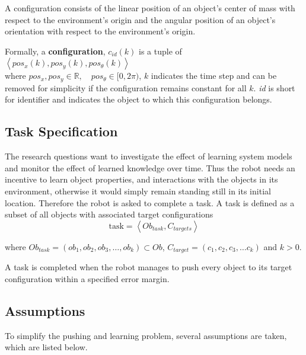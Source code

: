 A configuration consists of the linear position of an object's center of mass with respect to the environment's origin and the angular position of an object's orientation with respect to the environment's origin.\bs

Formally, a \textbf{configuration}, $c_{id}(k)$ is a tuple of $\left\langle pos_x(k), pos_y(k), pos_\theta(k)\right\rangle$\\ where $pos_x, pos_y \in \mathbb{R}, \quad  pos_\theta \in [0, 2\pi)$, \quad $k$ indicates the time step and can be removed for simplicity if the configuration remains constant for all $k$. \textit{id} is short for identifier and indicates the object to which this configuration belongs.\\

\subsection{Task Specification}%
\label{subsec:task}
The research questions want to investigate the effect of learning system models and monitor the effect of learned knowledge over time. Thus the robot needs an incentive to learn object properties, and interactions with the objects in its environment, otherwise it would simply remain standing still in its initial location. Therefore the robot is asked to complete a task. A task is defined as a subset of all objects with associated target configurations\bs
\[\text{task} = \left\langle Ob_{task}, C_{targets} \right\rangle\]

where $Ob_{task} = (ob_1, ob_2, ob_3, \dots, ob_k) \subset Ob$, $C_{target} = (c_1, c_2, c_3, \dots c_k)$ and $k>0$.\bs

A task is completed when the robot manages to push every object to its target configuration within a specified error margin.

\subsection{Assumptions}%
\label{subsec:assumptions}
To simplify the pushing and learning problem, several assumptions are taken, which are listed below.\bs


